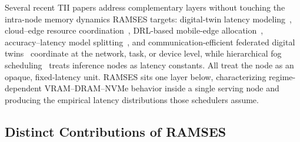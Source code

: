 Several recent TII papers address complementary layers without touching
the intra-node memory dynamics RAMSES targets: digital-twin latency
modeling~\cite{tao2019digitaltwin}, cloud--edge resource
coordination~\cite{cao2021edgecps}, DRL-based mobile-edge
allocation~\cite{chen2021drl,deng2020edgerl}, accuracy--latency model
splitting~\cite{wu2021dnninference}, and communication-efficient federated
digital twins~\cite{lu2021dtfl} coordinate at the network, task, or device
level, while hierarchical fog scheduling~\cite{chekired2018fogscheduling}
treats inference nodes as latency constants. All treat the node as an
opaque, fixed-latency unit. RAMSES sits one layer below, characterizing
regime-dependent VRAM--DRAM--NVMe behavior inside a single serving node and
producing the empirical latency distributions those schedulers assume.

\subsection{Distinct Contributions of RAMSES}
